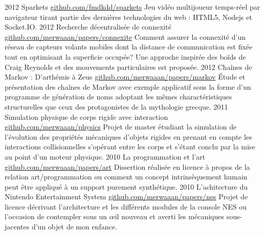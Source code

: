 \documentclass[]{friggeri-cv}
\begin{document}
\begin{entrylist}
  \entry
    {2012}
    {Sparkets}
    {\href{http://github.com/fmdkdd/sparkets}{github.com/fmdkdd/sparkets}}
    {Jeu vidéo multijoueur temps-réel par navigateur tirant partie des
      dernières technologies du web : HTML5, Nodejs et Socket.IO.}
  \entry
    {2012}
    {Recherche décentralisée de connexité}
    {\href{https://github.com/merwaaan/papers/blob/master/connexite/rapport.pdf?raw=true}{github.com/merwaaan/papers/connexite}}
    {Comment assurer la connexité d'un réseau de capteurs volants
      mobiles dont la distance de communication est fixée tout en
      optimisant la superficie occupée? Une
      approche inspirée des boïds de Craig Reynolds et des mouvements
      particulaires est proposée.}
  \entry
    {2012}
    {Chaînes de Markov : D'arthémis à Zeus}
    {\href{https://github.com/merwaaan/papers/blob/master/markov/rapport.pdf?raw=true}{github.com/merwaaan/papers/markov}}
    {\'Etude et présentation des chaînes de Markov avec exemple
      applicatif sous la forme d'un programme de génération de noms
      adoptant les mêmes charactéristiques structurelles que ceux des
      protagonistes de la mythologie grecque.}
  \entry
    {2011}
    {Simulation physique de corps rigide avec interaction}
    {\href{http://github.com/merwaaan/physics}{github.com/merwaaan/physics}}
    {Projet de master étudiant la simulation de l'évolution des
      propriétés mécaniques d'objets rigides en prenant en compte les
      interactions collisionnelles s'opérant entre les corps et
      s'étant conclu par la mise au point d'un moteur physique.}
  \entry
    {2010}
    {La programmation et l'art}
    {\href{http://github.com/merwaaan/papers/blob/master/art/progart.pdf?raw=true}{github.com/merwaaan/papers/art}}
    {Dissertion réalisée en licence à propos de la relation
      art/programmation ou comment un concept intrinsèquement humain
      peut être appliqué à un support purement synthétique.}
  \entry
    {2010}
    {L'achitecture du Nintendo Entertainment System}
    {\href{https://github.com/merwaaan/papers/blob/master/nes/archines.pdf?raw=true}{github.com/merwaaan/papers/nes}}
    {Projet de licence décrivant l'architecture et les différents
      modules de la console NES ou l'occasion de contempler sous un
      \oe il nouveau et averti les mécaniques sous-jacentes d'un objet
      de mon enfance.}

\end{entrylist}
\end{document}
